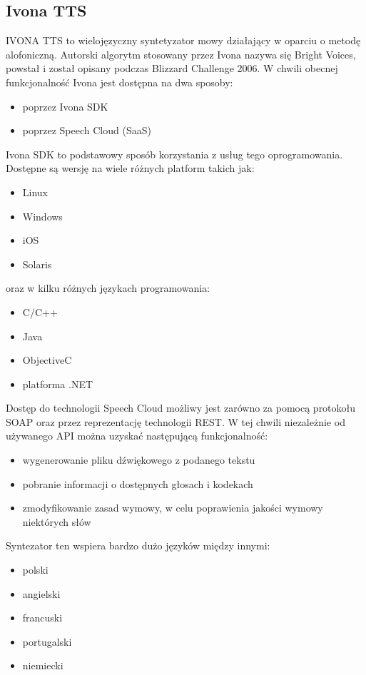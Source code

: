 \subsection{Ivona TTS}
IVONA TTS \cite{ivonasite} to wielojęzyczny syntetyzator mowy działający w oparciu o metodę alofoniczną. Autorski algorytm stosowany przez Ivona nazywa się Bright Voices,  powstał i został opisany podczas Blizzard Challenge 2006. W chwili obecnej funkcjonalność Ivona jest dostępna na dwa sposoby:
\begin{itemize}
	\item poprzez Ivona SDK
	\item poprzez Speech Cloud (SaaS)
\end{itemize}
Ivona SDK to podstawowy sposób korzystania z usług tego oprogramowania. Dostępne są wersję na wiele różnych platform takich jak:
\begin{itemize}
	\item Linux
	\item Windows
	\item iOS
	\item Solaris
\end{itemize}
oraz w kilku różnych językach programowania:
\begin{itemize}
	\item C/C++
	\item Java
	\item ObjectiveC
	\item platforma .NET
\end{itemize}
Dostęp do technologii Speech Cloud możliwy jest zarówno za pomocą protokołu SOAP oraz przez reprezentację technologii REST. W tej chwili niezależnie od używanego API można uzyskać następującą funkcjonalność:
\begin{itemize}
	\item wygenerowanie pliku dźwiękowego z podanego tekstu
	\item pobranie informacji o dostępnych głosach i kodekach
	\item zmodyfikowanie zasad wymowy, w celu poprawienia jakości wymowy niektórych słów
\end{itemize}
Syntezator ten wspiera bardzo dużo języków między innymi:
 \begin{itemize}
	\item polski
	\item angielski
	\item francuski
	\item portugalski
	\item niemiecki
\end{itemize}
